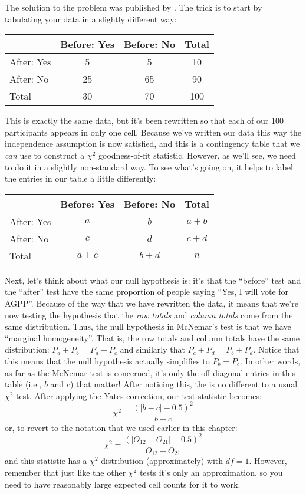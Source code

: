 The solution to the problem was published by \textcite{McNemar1947}. The trick is to start by tabulating your data in a slightly different way:
\begin{center}
\begin{tabular}{l|cc|c}
& Before: Yes & Before: No & Total \\ \hline
After: Yes   & 5 & 5 & 10 \\
After: No    & 25 & 65 & 90 \\ \hline
Total        & 30 & 70 & 100
\end{tabular}
\end{center}
\noindent
This is exactly the same data, but it's been rewritten so that each of our 100 participants appears in only one cell. Because we've written our data this way the independence assumption is now satisfied, and this is a contingency table that we {\it can} use to construct a $\chi^2$ goodness-of-fit statistic. However, as we'll see, we need to do it in a slightly non-standard way. To see what's going on, it helps to label the entries in our table a little differently:
\begin{center}
\begin{tabular}{l|cc|c}
& Before: Yes & Before: No & Total \\ \hline
After: Yes   & $a$ & $b$ & $a+b$ \\
After: No & $c$ & $d$ & $c+d$ \\ \hline
Total & $a+c$ & $b+d$ & $n$
\end{tabular}
\end{center}
\noindent
Next, let's think about what our null hypothesis is: it's that the ``before'' test and the ``after'' test have the same proportion of people saying ``Yes, I will vote for AGPP''. Because of the way that we have rewritten the data, it means that we're now testing the hypothesis that the {\it row totals} and {\it column totals} come from the same distribution. Thus, the null hypothesis in McNemar's test is that we have ``marginal homogeneity''. That is, the row totals and column totals have the same distribution: $P_a + P_b = P_a + P_c$ and similarly that $P_c + P_d = P_b + P_d$. Notice that this means that the null hypothesis actually simplifies to $P_b = P_c$. In other words, as far as the McNemar test is concerned, it's only the off-diagonal entries in this table (i.e., $b$ and $c$) that matter! After noticing this, the  is no different to a usual $\chi^2$ test. After applying the Yates correction, our test statistic becomes:
$$
\chi^2 = \frac{(|b-c| - 0.5)^2}{b+c}
$$
or, to revert to the notation that we used earlier in this chapter:
$$
\chi^2 = \frac{(|O_{12}-O_{21}| - 0.5)^2}{O_{12} + O_{21}}
$$
and this statistic has a $\chi^2$ distribution (approximately) with $df=1$. However, remember that just like the other $\chi^2$ tests it's only an approximation, so you need to have reasonably large expected cell counts for it to work.


